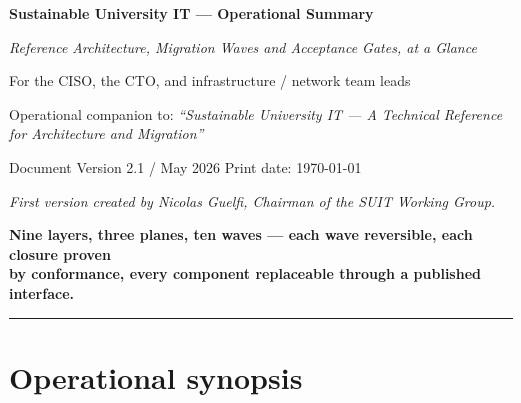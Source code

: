 \documentclass[11pt,a4paper]{article}
\begin{document}
\begin{center}
\vspace*{-0.2cm}
{\Large\bfseries Sustainable University IT --- Operational Summary}
\par\smallskip
{\normalsize\itshape Reference Architecture, Migration Waves and Acceptance Gates, at a Glance}
\par\smallskip
{\small For the CISO, the CTO, and infrastructure / network team leads}
\par\smallskip
{\scriptsize Operational companion to: \emph{``Sustainable University IT ---
A Technical Reference for Architecture and Migration''}}
\par\smallskip
{\small Document Version 2.1 / May 2026 \quad\textbullet\quad Print date: \today}
\par\smallskip
{\footnotesize\itshape First version created by Nicolas Guelfi, Chairman of the SUIT Working Group.}
\par\medskip
\begin{tcolorbox}[colback=NavyBlue!8!white,colframe=NavyBlue!85!black,
    boxrule=1.2pt,arc=3pt,left=10pt,right=10pt,top=8pt,bottom=8pt,halign=center]
{\normalsize\bfseries Nine layers, three planes, ten waves ---
each wave reversible, each closure proven\\[3pt]
by conformance, every component replaceable through a published interface.}
\end{tcolorbox}
\end{center}

\smallskip
\noindent\rule{\textwidth}{0.6pt}

\section{Operational synopsis}
\end{document}
